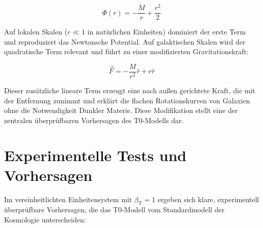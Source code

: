 \documentclass[12pt,a4paper]{article}
\newcommand{\betaT}{\beta_{\text{T}}}
\begin{document}
	\begin{equation}
		\Phi(r) = -\frac{M}{r} + \frac{r^2}{2}
	\end{equation}
	
	Auf lokalen Skalen (\(r \ll 1\) in natürlichen Einheiten) dominiert der erste Term und reproduziert das Newtonsche Potential. Auf galaktischen Skalen wird der quadratische Term relevant und führt zu einer modifizierten Gravitationskraft:
	
	\begin{equation}
		\vec{F} = -\frac{M}{r^2} \hat{r} + r \hat{r}
	\end{equation}
	
	Dieser zusätzliche lineare Term erzeugt eine nach außen gerichtete Kraft, die mit der Entfernung zunimmt und erklärt die flachen Rotationskurven von Galaxien ohne die Notwendigkeit Dunkler Materie. Diese Modifikation stellt eine der zentralen überprüfbaren Vorhersagen des T0-Modells dar.
	
	\section{Experimentelle Tests und Vorhersagen}
	
	Im vereinheitlichten Einheitensystem mit \(\betaT = 1\) ergeben sich klare, experimentell überprüfbare Vorhersagen, die das T0-Modell vom Standardmodell der Kosmologie unterscheiden:
	
\end{document}
